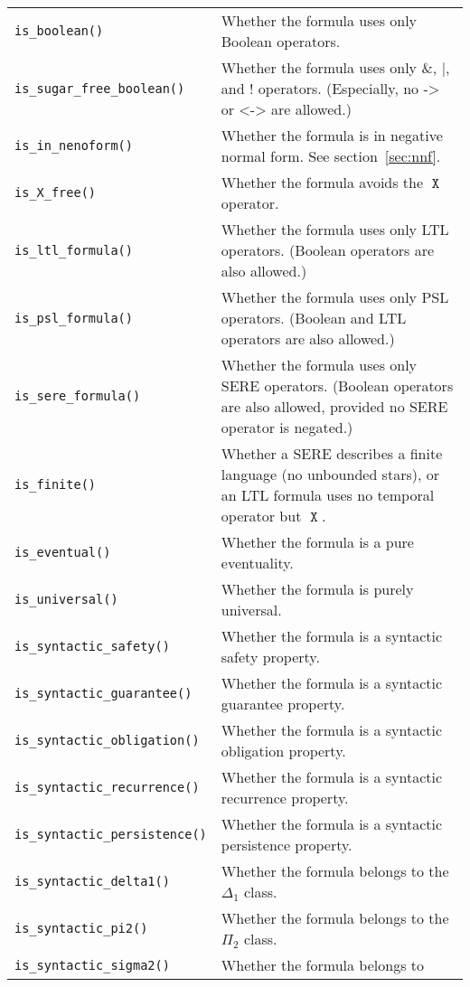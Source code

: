 \documentclass[a4paper,twoside,10pt,DIV=12]{scrreprt}
\DeclareMathOperator{\X}{\texttt{X}}
\DeclareMathOperator{\NOT}{\texttt{!}}
\newcommand{\IMPLIES}{\mathbin{\texttt{->}}}
\newcommand{\EQUIV}{\mathbin{\texttt{<->}}}
\newcommand{\OR}{\mathbin{\texttt{|}}}
\newcommand{\AND}{\mathbin{\texttt{\&}}}
\newcommand{\0}{\texttt{0}}
\newcommand{\1}{\texttt{1}}
\begin{document}
\noindent
\label{property-methods}
\begin{tabulary}{.995\textwidth}{@{}lJ@{}}
\texttt{is\_boolean()}& Whether the formula uses only Boolean
  operators.
\\\texttt{is\_sugar\_free\_boolean()}& Whether the formula uses
  only $\AND$, $\OR$, and $\NOT$ operators.  (Especially, no
  $\IMPLIES$ or $\EQUIV$ are allowed.)
\\\texttt{is\_in\_nenoform()}& Whether the formula is in negative
  normal form. See section~\ref{sec:nnf}.
\\\texttt{is\_X\_free()}&
  Whether the formula avoids the $\X$ operator.
\\\texttt{is\_ltl\_formula()}& Whether the formula uses only LTL
  operators. (Boolean operators are also allowed.)
\\\texttt{is\_psl\_formula()}& Whether the formula uses only PSL
  operators. (Boolean and LTL operators are also allowed.)
\\\texttt{is\_sere\_formula()}& Whether the formula uses only
  SERE operators. (Boolean operators are also allowed, provided
  no SERE operator is negated.)
\\\texttt{is\_finite()}& Whether a SERE describes a finite
  language (no unbounded stars), or an LTL formula uses no
  temporal operator but $\X$.
\\\texttt{is\_eventual()}& Whether the formula is a pure eventuality.
\\\texttt{is\_universal()}& Whether the formula is purely universal.
\\\texttt{is\_syntactic\_safety()}& Whether the formula is a syntactic
  safety property.
\\\texttt{is\_syntactic\_guarantee()}& Whether the formula is a syntactic
  guarantee property.
\\\texttt{is\_syntactic\_obligation()}& Whether the formula is a syntactic
  obligation property.
\\\texttt{is\_syntactic\_recurrence()}& Whether the formula is a syntactic
  recurrence property.
\\\texttt{is\_syntactic\_persistence()}& Whether the formula is a syntactic
  persistence property.
\\\texttt{is\_syntactic\_delta1()}& Whether the formula belongs to
                                    the $\Delta_1$ class.
\\\texttt{is\_syntactic\_pi2()}& Whether the formula belongs to
                                 the $\Pi_2$ class.
\\\texttt{is\_syntactic\_sigma2()}& Whether the formula belongs to

\end{tabulary}
\end{document}
